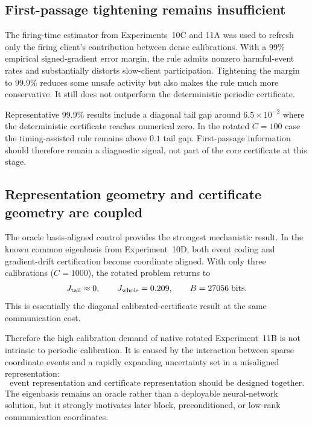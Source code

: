 \subsection{First-passage tightening remains insufficient}

The firing-time estimator from Experiments~10C and 11A was used to refresh only the firing client's contribution between dense calibrations. With a 99\% empirical signed-gradient error margin, the rule admits nonzero harmful-event rates and substantially distorts slow-client participation. Tightening the margin to 99.9\% reduces some unsafe activity but also makes the rule much more conservative. It still does not outperform the deterministic periodic certificate.

Representative 99.9\% results include a diagonal tail gap around $6.5\times10^{-2}$ where the deterministic certificate reaches numerical zero. In the rotated $C=100$ case the timing-assisted rule remains above $0.1$ tail gap. First-passage information should therefore remain a diagnostic signal, not part of the core certificate at this stage.

\subsection{Representation geometry and certificate geometry are coupled}

The oracle basis-aligned control provides the strongest mechanistic result. In the known common eigenbasis from Experiment~10D, both event coding and gradient-drift certification become coordinate aligned. With only three calibrations ($C=1000$), the rotated problem returns to
\begin{equation}
  J_{\rm tail}\approx0,
  \qquad
  J_{\rm whole}=0.209,
  \qquad
  B=27056\;\text{bits}.
\end{equation}
This is essentially the diagonal calibrated-certificate result at the same communication cost.

Therefore the high calibration demand of native rotated Experiment~11B is not intrinsic to periodic calibration. It is caused by the interaction between sparse coordinate events and a rapidly expanding uncertainty set in a misaligned representation:
\begin{equation}
  \boxed{\text{event representation and certificate representation should be designed together.}}
\end{equation}
The eigenbasis remains an oracle rather than a deployable neural-network solution, but it strongly motivates later block, preconditioned, or low-rank communication coordinates.

